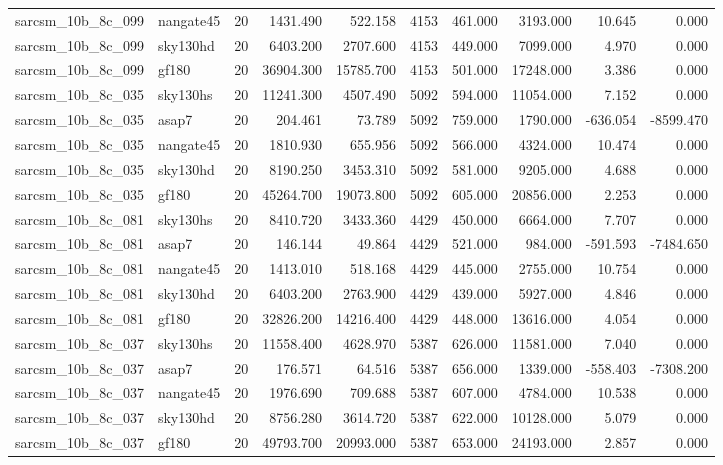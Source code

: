 \begin{longtable}{llrrrrrrrr}
sarcsm\_10b\_8c\_099 & nangate45 & 20 & 1431.490 & 522.158 & 4153 & 461.000 & 3193.000 & 10.645 & 0.000 \\
sarcsm\_10b\_8c\_099 & sky130hd & 20 & 6403.200 & 2707.600 & 4153 & 449.000 & 7099.000 & 4.970 & 0.000 \\
sarcsm\_10b\_8c\_099 & gf180 & 20 & 36904.300 & 15785.700 & 4153 & 501.000 & 17248.000 & 3.386 & 0.000 \\
sarcsm\_10b\_8c\_035 & sky130hs & 20 & 11241.300 & 4507.490 & 5092 & 594.000 & 11054.000 & 7.152 & 0.000 \\
sarcsm\_10b\_8c\_035 & asap7 & 20 & 204.461 & 73.789 & 5092 & 759.000 & 1790.000 & -636.054 & -8599.470 \\
sarcsm\_10b\_8c\_035 & nangate45 & 20 & 1810.930 & 655.956 & 5092 & 566.000 & 4324.000 & 10.474 & 0.000 \\
sarcsm\_10b\_8c\_035 & sky130hd & 20 & 8190.250 & 3453.310 & 5092 & 581.000 & 9205.000 & 4.688 & 0.000 \\
sarcsm\_10b\_8c\_035 & gf180 & 20 & 45264.700 & 19073.800 & 5092 & 605.000 & 20856.000 & 2.253 & 0.000 \\
sarcsm\_10b\_8c\_081 & sky130hs & 20 & 8410.720 & 3433.360 & 4429 & 450.000 & 6664.000 & 7.707 & 0.000 \\
sarcsm\_10b\_8c\_081 & asap7 & 20 & 146.144 & 49.864 & 4429 & 521.000 & 984.000 & -591.593 & -7484.650 \\
sarcsm\_10b\_8c\_081 & nangate45 & 20 & 1413.010 & 518.168 & 4429 & 445.000 & 2755.000 & 10.754 & 0.000 \\
sarcsm\_10b\_8c\_081 & sky130hd & 20 & 6403.200 & 2763.900 & 4429 & 439.000 & 5927.000 & 4.846 & 0.000 \\
sarcsm\_10b\_8c\_081 & gf180 & 20 & 32826.200 & 14216.400 & 4429 & 448.000 & 13616.000 & 4.054 & 0.000 \\
sarcsm\_10b\_8c\_037 & sky130hs & 20 & 11558.400 & 4628.970 & 5387 & 626.000 & 11581.000 & 7.040 & 0.000 \\
sarcsm\_10b\_8c\_037 & asap7 & 20 & 176.571 & 64.516 & 5387 & 656.000 & 1339.000 & -558.403 & -7308.200 \\
sarcsm\_10b\_8c\_037 & nangate45 & 20 & 1976.690 & 709.688 & 5387 & 607.000 & 4784.000 & 10.538 & 0.000 \\
sarcsm\_10b\_8c\_037 & sky130hd & 20 & 8756.280 & 3614.720 & 5387 & 622.000 & 10128.000 & 5.079 & 0.000 \\
sarcsm\_10b\_8c\_037 & gf180 & 20 & 49793.700 & 20993.000 & 5387 & 653.000 & 24193.000 & 2.857 & 0.000 \\

\end{longtable}
